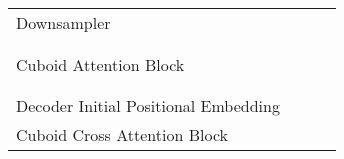 \documentclass{article}
\begin{document}
\begin{table}[!tb]
\begin{center}
{\begin{tabular}{l|l|c|c}
                                                        &             &                       &               \\\hline
    \multirow{3}{*}{Downsampler}                        &      &  & \\
                                                        &       &                       &              \\
                                                        &          &                       & \\\hline  
    \multirow{9}{*}{Cuboid Attention Block }  &       &                       &              \\
                                                        &   &                       &              \\
                                                        &             &                       &              \\
                                                        &       &                       &              \\
                                                        &   &                       &              \\
                                                        &             &                       &              \\
                                                        &       &                       &              \\
                                                        &   &                       &              \\
                                                        &             &                       &              \\\hline
    \midrule
    Decoder Initial Positional Embedding                &        &                       &              \\\hline
    \multirow{12}{*}{Cuboid Cross Attention Block }&  &                       &              \\
                                                        &   &                       &              \\
                                                        &             &                       &              \\
                                                        &       &                       &              \\

\end{tabular}}
\end{center}
\end{table}
\end{document}
